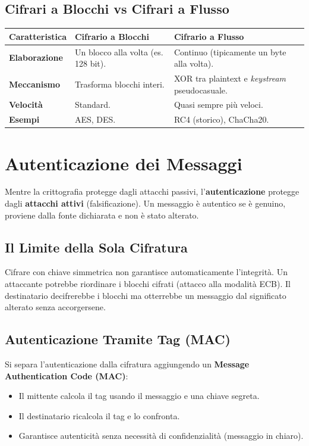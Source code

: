 \subsection{Cifrari a Blocchi vs Cifrari a Flusso}
\begin{table}[H]
\centering
\begin{tabular}{|l|p{6cm}|p{6cm}|}
\hline
\textbf{Caratteristica} & \textbf{Cifrario a Blocchi} & \textbf{Cifrario a Flusso} \\ \hline
\textbf{Elaborazione} & Un blocco alla volta (es. 128 bit). & Continuo (tipicamente un byte alla volta). \\ \hline
\textbf{Meccanismo} & Trasforma blocchi interi. & XOR tra plaintext e \textit{keystream} pseudocasuale. \\ \hline
\textbf{Velocità} & Standard. & Quasi sempre più veloci. \\ \hline
\textbf{Esempi} & AES, DES. & RC4 (storico), ChaCha20. \\ \hline
\end{tabular}
\end{table}



\section{Autenticazione dei Messaggi}
Mentre la crittografia protegge dagli attacchi passivi, l'\textbf{autenticazione} protegge dagli \textbf{attacchi attivi} (falsificazione). Un messaggio è autentico se è genuino, proviene dalla fonte dichiarata e non è stato alterato.

\subsection{Il Limite della Sola Cifratura}
Cifrare con chiave simmetrica non garantisce automaticamente l'integrità. Un attaccante potrebbe riordinare i blocchi cifrati (attacco alla modalità ECB). Il destinatario decifrerebbe i blocchi ma otterrebbe un messaggio dal significato alterato senza accorgersene.

\subsection{Autenticazione Tramite Tag (MAC)}
Si separa l'autenticazione dalla cifratura aggiungendo un \textbf{Message Authentication Code (MAC)}:
\begin{itemize}
    \item Il mittente calcola il tag usando il messaggio e una chiave segreta.
    \item Il destinatario ricalcola il tag e lo confronta.
    \item Garantisce autenticità senza necessità di confidenzialità (messaggio in chiaro).
\end{itemize}



